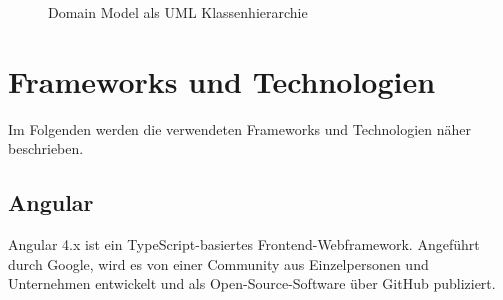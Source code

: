 \begin{figure}
\centering
{}
\caption{Domain Model als UML Klassenhierarchie}
\label{fig:domModel}
\end{figure}


\section{Frameworks und Technologien}

Im Folgenden werden die verwendeten Frameworks und Technologien näher beschrieben.

\subsection{Angular}

Angular 4.x \cite{angular} ist ein TypeScript-basiertes Frontend-Webframework. Angeführt durch Google, wird es von einer Community aus Einzelpersonen und Unternehmen entwickelt und als Open-Source-Software über GitHub \cite{angularGit} publiziert.


